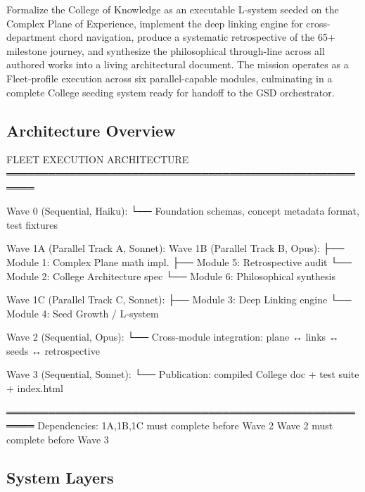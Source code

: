 \documentclass[11pt,letterpaper]{article}
\begin{document}
Formalize the College of Knowledge as an executable L-system seeded on the Complex Plane of
Experience, implement the deep linking engine for cross-department chord navigation, produce a
systematic retrospective of the 65+ milestone journey, and synthesize the philosophical
through-line across all authored works into a living architectural document. The mission operates
as a Fleet-profile execution across six parallel-capable modules, culminating in a complete
College seeding system ready for handoff to the GSD orchestrator.

\subsection{Architecture Overview}

\begin{asciibox}
  FLEET EXECUTION ARCHITECTURE
  ══════════════════════════════════════════════════════

  Wave 0 (Sequential, Haiku):
  └── Foundation schemas, concept metadata format, test fixtures

  Wave 1A (Parallel Track A, Sonnet):         Wave 1B (Parallel Track B, Opus):
  ├── Module 1: Complex Plane math impl.       ├── Module 5: Retrospective audit
  └── Module 2: College Architecture spec      └── Module 6: Philosophical synthesis

  Wave 1C (Parallel Track C, Sonnet):
  ├── Module 3: Deep Linking engine
  └── Module 4: Seed Growth / L-system

  Wave 2 (Sequential, Opus):
  └── Cross-module integration: plane ↔ links ↔ seeds ↔ retrospective

  Wave 3 (Sequential, Sonnet):
  └── Publication: compiled College doc + test suite + index.html

  ══════════════════════════════════════════════════════
  Dependencies: 1A,1B,1C must complete before Wave 2
                Wave 2 must complete before Wave 3
\end{asciibox}

\subsection{System Layers}
\end{document}

